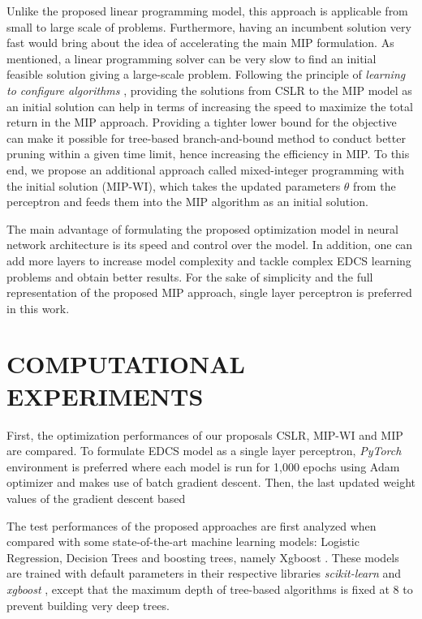 \documentclass[a4paper,onesided,12pt]{report}
\begin{document}
Unlike the proposed linear programming model, this approach is applicable from small to large scale of problems. Furthermore, having an incumbent solution very fast would bring about the idea of accelerating the main MIP formulation. As mentioned, a linear programming solver can be very slow to find an initial feasible solution giving a large-scale problem. Following the principle of \emph{learning to configure algorithms} \cite{bengio2020machine}, providing the solutions from CSLR to the MIP model as an initial solution can help in terms of increasing the speed to maximize the total return in the MIP approach. Providing a tighter lower bound for the objective can make it possible for tree-based branch-and-bound method to conduct better pruning within a given time limit, hence increasing the efficiency in MIP. To this end, we propose an additional approach called mixed-integer programming with the initial solution (MIP-WI), which takes the updated parameters $\theta$ from the perceptron and feeds them into the MIP algorithm as an initial solution.

The main advantage of formulating the proposed optimization model in neural network architecture is its speed and control over the model. In addition, one can add more layers to increase model complexity and tackle complex EDCS learning problems and obtain better results. For the sake of simplicity and the full representation of the proposed MIP approach, single layer perceptron is preferred in this work.

\chapter{COMPUTATIONAL EXPERIMENTS}
\label{sec:computationalexperiment}

First, the optimization performances of our proposals CSLR, MIP-WI and MIP are compared. To formulate EDCS model as a single layer perceptron, \emph{PyTorch} environment is preferred where each model is run for 1,000 epochs using Adam optimizer \cite{kingma2014adam} and makes use of batch gradient descent. Then, the last updated weight values of the gradient descent based 

The test performances of the proposed approaches are first analyzed when compared with some state-of-the-art machine learning models: Logistic Regression, Decision Trees and boosting trees, namely Xgboost \cite{Chen_2016}. These models are trained with default parameters in their respective libraries \emph{scikit-learn} \cite{DBLP:journals/corr/abs-1201-0490} and \emph{xgboost} \cite{Chen_2016}, except that the maximum depth of tree-based algorithms is fixed at $8$ to prevent building very deep trees.
\end{document}
